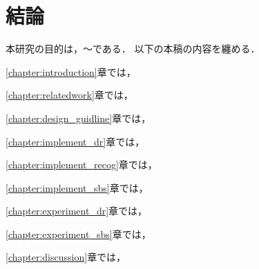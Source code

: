 \chapter{結論}
\label{chapter:conclusion}
  本研究の目的は，〜である．
  以下の本稿の内容を纏める．

  \ref{chapter:introduction}章では，

  \ref{chapter:relatedwork}章では，

  \ref{chapter:design_guidline}章では，

  \ref{chapter:implement_dr}章では，

  \ref{chapter:implement_recog}章では，

  \ref{chapter:implement_sbs}章では，

  \ref{chapter:experiment_dr}章では，

  \ref{chapter:experiment_sbs}章では，

  \ref{chapter:discussion}章では，
